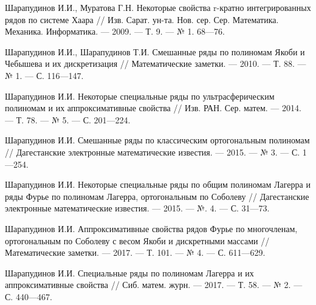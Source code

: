 \begin{thebibliography}{111}
Шарапудинов И.И., Муратова Г.Н. Некоторые свойства r-кратно интегрированных рядов по системе Хаара // Изв. Сарат. ун-та. Нов. сер. Сер. Математика. Механика. Информатика. --- 2009. --- Т. 9. --- № 1. 68---76.








Шарапудинов И.И., Шарапудинов Т.И. Смешанные ряды по полиномам Якоби и Чебышева и их дискретизация // Математические заметки. --- 2010. --- Т. 88. --- № 1. --- С. 116---147.








Шарапудинов И.И. Некоторые специальные ряды по ультрасферическим полиномам и их аппроксимативные свойства // Изв. РАН. Сер. матем. --- 2014. --- Т. 78. --- № 5. --- С. 201---224.








Шарапудинов И.И. Смешанные ряды по классическим ортогональным полиномам // Дагестанские электронные математические известия. --- 2015. --- № 3. --- С. 1---254.








Шарапудинов И.И. Некоторые специальные ряды по общим полиномам Лагерра и ряды Фурье по полиномам Лагерра, ортогональным по Соболеву // Дагестанские электронные математические известия. --- 2015. --- №. 4. --- С. 31---73.








Шарапудинов И.И. Аппроксимативные свойства рядов Фурье по многочленам, ортогональным по Соболеву с весом Якоби и дискретными массами // Математические заметки. --- 2017. --- Т. 101. --- № 4. --- С. 611---629.








Шарапудинов И.И. Специальные ряды по полиномам Лагерра и их аппроксимативные свойства // Сиб. матем. журн. --- 2017. --- Т. 58. --- № 2. --- С. 440---467.









\end{thebibliography}
